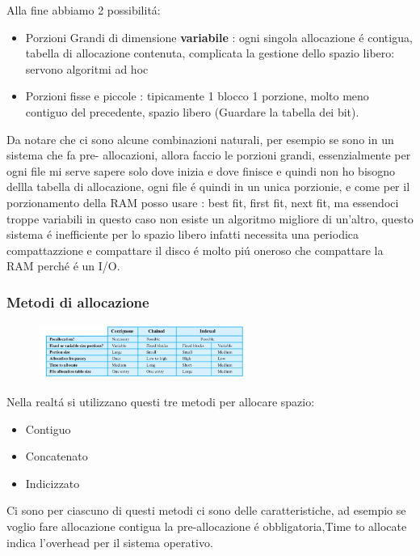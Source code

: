 Alla fine abbiamo 2 possibilitá:
\begin{itemize}
    \item Porzioni Grandi di dimensione  \textbf{variabile} : ogni singola allocazione é contigua, tabella di allocazione contenuta, complicata la gestione dello spazio libero: servono algoritmi ad hoc
    \item Porzioni fisse e piccole : tipicamente 1 blocco 1 porzione, molto meno contiguo del precedente, spazio libero (Guardare la tabella dei bit).
    \end{itemize}
Da notare che ci sono alcune combinazioni naturali, per esempio se sono in un sistema che fa pre- allocazioni, allora
faccio le porzioni grandi, essenzialmente per ogni file mi serve sapere solo dove inizia e dove finisce e quindi non ho bisogno
dellla tabella di allocazione, ogni file é quindi in un unica porzionie, e come per il porzionamento della RAM posso usare : best fit, first fit, next fit,
ma essendoci troppe variabili in questo caso non esiste un algoritmo migliore di un'altro, questo sistema é inefficiente per lo spazio
libero infatti necessita una periodica compattazzione e compattare il disco é molto piú oneroso che compattare la RAM perché é un I/O.
\subsubsection*{Metodi di allocazione}
\begin{figure}[H]
    \centering
    \includegraphics[width=0.6\textwidth]{immagini/MetodiDiAllocazione}
\end{figure}
Nella realtá si utilizzano questi tre metodi per allocare spazio:
\begin{itemize}
    \item Contiguo
    \item Concatenato
    \item Indicizzato
\end{itemize}
Ci sono per ciascuno di questi metodi ci sono delle caratteristiche, ad esempio se voglio fare allocazione
contigua la pre-allocazione é obbligatoria,Time to allocate indica l'overhead per il sistema operativo.
